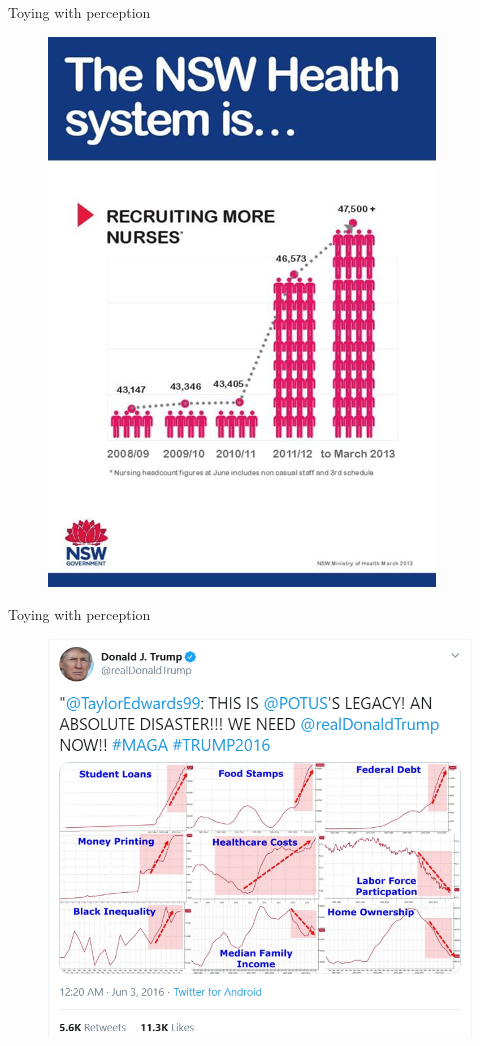 \documentclass[12pt,english,pdf,dvipsnames,handout]{beamer}
\begin{document}
\begin{frame}{Toying with perception}

\begin{figure}
	\centering
	\includegraphics[scale=0.5]{../04-graphs/23_NSW_health}
\end{figure}

\end{frame}


\begin{frame}{Toying with perception}
	
	\begin{figure}
		\centering
		\includegraphics[scale=0.5]{../04-graphs/32_Trump_misleading_tweet}
	\end{figure}
	
\end{frame}
\end{document}
